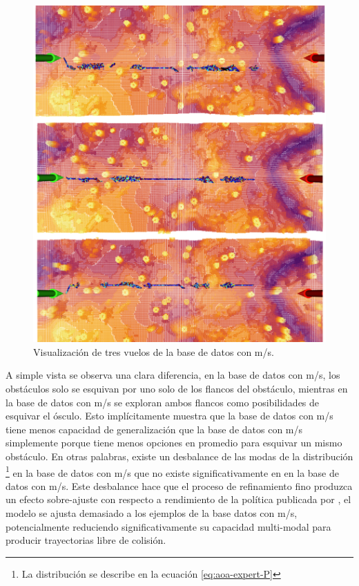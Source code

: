 \begin{figure}[H]
    \centering
    \includegraphics[scale=0.4]{partes/img/1ms-sample.png}
    \caption[Visualización de tres vuelos de la base de datos con  m/s.]{Visualización de tres vuelos de la base de datos con  m/s.}
    \label{fig:1ms-sample}
\end{figure}

A simple vista se observa una clara diferencia, en la base de datos con  m/s, los obstáculos solo se esquivan por uno solo de los flancos del obstáculo, mientras en la base de datos con  m/s se exploran ambos flancos como posibilidades de esquivar el ósculo. Esto implícitamente muestra que la base de datos con  m/s tiene menos capacidad de generalización que la base de datos con  m/s simplemente porque tiene menos opciones en promedio para esquivar un mismo obstáculo. En otras palabras, existe un desbalance de las modas de la distribución \footnote{La distribución  se describe en la ecuación \ref{eq:aoa-expert-P}} en la base de datos con  m/s que no existe significativamente en en la base de datos con  m/s. Este desbalance hace que el proceso de refinamiento fino produzca un efecto sobre-ajuste con respecto a rendimiento de la política publicada por \cite{Loquercio2021}, el modelo se ajusta demasiado a los ejemplos de la base datos con  m/s, potencialmente reduciendo significativamente su capacidad multi-modal para producir trayectorias libre de colisión.

